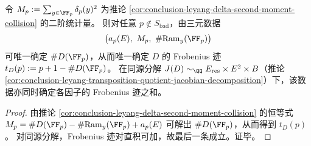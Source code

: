 \begin{corollary}\label{cor:conclusion-leyang-boundary-second-moment-trace-readout}
令
\(
M_p:=\sum_{y\in\FF_p}\delta_p(y)^2
\)
为推论 \ref{cor:conclusion-leyang-delta-second-moment-collision} 的二阶统计量。
则对任意 \(p\notin S_{\mathrm{bad}}\)，由三元数据
\[
\bigl(a_p(E),\ M_p,\ \#\mathrm{Ram}_y(\FF_p)\bigr)
\]
可唯一确定 \(\#D(\FF_p)\)，从而唯一确定 \(D\) 的 Frobenius 迹
\(
t_D(p):=p+1-\#D(\FF_p)
\)。
在同源分解 \(J(D)\sim_{\QQ}E_{\mathrm{res}}\times E^2\times B\)（推论 \ref{cor:conclusion-leyang-transposition-quotient-jacobian-decomposition}）下，该数据亦同时确定各因子的 Frobenius 迹之和。
\end{corollary}
\begin{proof}
由推论 \ref{cor:conclusion-leyang-delta-second-moment-collision} 的恒等式
\(
M_p=\#D(\FF_p)-\#\mathrm{Ram}_y(\FF_p)+a_p(E)
\)
可解出 \(\#D(\FF_p)\)，从而得到 \(t_D(p)\)。
对同源分解，Frobenius 迹对直积可加，故最后一条成立。证毕。
\end{proof}
\endinput
